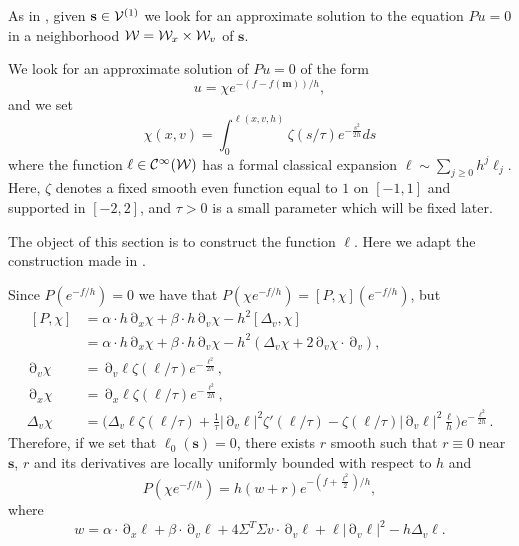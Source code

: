 \documentclass[12pt]{amsart}
\numberwithin{equation}{section}
\numberwithin{figure}{section}
\def\m{\mathbf{m}}
\def\s{\mathbf{s}}
\DeclareMathOperator{\p}{\partial}
\begin{document}
As in \cite{BoLePMi22}, given $\s\in\vvv^{(1)}$ we look for an approximate solution to the equation $Pu = 0$ in a neighborhood ${\mathcal W} = {\mathcal W}_x\times{\mathcal W}_v$ of $\s$.

We look for an approximate solution of $P u = 0$ of the form
\begin{equation*}
u=\chi e^{-(f-f(\m))/h},
\end{equation*}
and we set
\begin{equation*}
\chi(x,v)=\int_0^{\ell(x,v,h)}\zeta(s/\tau)e^{-\frac{s^2}{2h}}ds
\end{equation*}
where the function $\ell\in{\mathcal C}^\infty({\mathcal W})$ has a formal classical expansion $\ell\sim\sum_{j\geq0}h^j\ell_j$. Here, $\zeta$ denotes a fixed smooth even function equal to $1$ on $[-1,1]$ and supported in $[-2,2]$, and $\tau > 0$ is a small parameter which will be fixed later.

The object of this section is to construct the function $\ell$. Here we adapt the construction made in \cite[section 3]{BoLePMi22}.

Since $P(e^{-f/h}) = 0$ we have that $P(\chi e^{-f/h}) = [P,\chi](e^{-f/h})$, but
\begin{equation*}
\begin{aligned}~
    [P,\chi] &= \alpha\cdot h\p_x\chi + \beta\cdot h\p_v\chi - h^2[\Delta_v,\chi]\\
    &= \alpha\cdot h\p_x\chi + \beta\cdot h\p_v\chi - h^2(\Delta_v \chi + 2\p_v \chi\cdot\p_v),\\
    \p_v \chi &= \p_v\ell\zeta(\ell/\tau)e^{-\frac{\ell^{2}}{2h}},\\
    \p_x \chi &= \p_x\ell\zeta(\ell/\tau)e^{-\frac{\ell^{2}}{2h}},\\
    \Delta_v \chi &= \Big(\Delta_v\ell\zeta(\ell/\tau) + \frac1\tau|\p_v\ell|^2\zeta'(\ell/\tau)-\zeta(\ell/\tau)|\p_v\ell|^2\frac{\ell}{h}\Big)e^{-\frac{\ell^{2}}{2h}}.
\end{aligned}
\end{equation*}
Therefore, if we set that $\ell_0(\s) = 0$, there exists $r$ smooth such that $r\equiv0$ near $\s$, $r$ and its derivatives are locally uniformly bounded with respect to $h$ and
\begin{equation}\label{eq:wplusr}
P(\chi e^{-f/h}) = h(w+r)e^{-(f+\frac{\ell^{2}}{2})/h},
\end{equation}
where
\begin{equation*}
w = \alpha\cdot \p_x\ell + \beta\cdot \p_v\ell + 4\Sigma^T\Sigma v\cdot\p_v\ell + \ell|\p_v\ell|^2 - h\Delta_v\ell.
\end{equation*}
\end{document}
